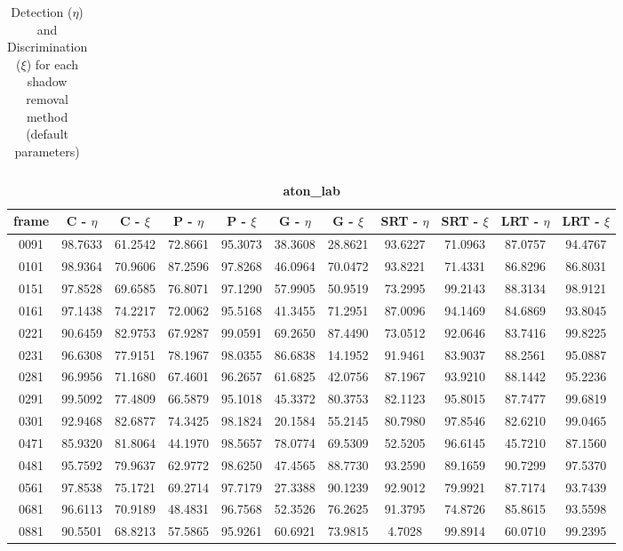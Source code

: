 \begin{appendices}
\begin{table}
\begin{tabular}{ |c|c|c|c|c|c|c|c|c|c|c| }
\hline
\end{tabular}
\caption*{Detection ($\eta$) and Discrimination ($\xi$) for each shadow removal method (default parameters)}
\end{table}

\begin{table}
\centering
\caption{\textbf{aton\_lab}}
\begin{tabular}{ |c|c|c|c|c|c|c|c|c|c|c| }
	\hline
\textbf{frame} &  \textbf{C - $\eta$} &  \textbf{C - $\xi$} &  \textbf{P - $\eta$} &  \textbf{P - $\xi$} &  \textbf{G - $\eta$} &  \textbf{G - $\xi$} &  \textbf{SRT - $\eta$} &  \textbf{SRT - $\xi$} &  \textbf{LRT - $\eta$} &  \textbf{LRT - $\xi$} \\
\hline
\hline
0091 &  98.7633 &  61.2542 &   72.8661 &  95.3073 &   38.3608 &  28.8621 &   93.6227 &  71.0963 &   87.0757 &  94.4767    \\
\hline
0101 &  98.9364 &  70.9606 &   87.2596 &  97.8268 &   46.0964 &  70.0472 &   93.8221 &  71.4331 &   86.8296 &  86.8031    \\
\hline
0151 &  97.8528 &  69.6585 &   76.8071 &  97.1290 &   57.9905 &  50.9519 &   73.2995 &  99.2143 &   88.3134 &  98.9121    \\
\hline
0161 &  97.1438 &  74.2217 &   72.0062 &  95.5168 &   41.3455 &  71.2951 &   87.0096 &  94.1469 &   84.6869 &  93.8045    \\
\hline
0221 &  90.6459 &  82.9753 &   67.9287 &  99.0591 &   69.2650 &  87.4490 &   73.0512 &  92.0646 &   83.7416 &  99.8225    \\
\hline
0231 &  96.6308 &  77.9151 &   78.1967 &  98.0355 &   86.6838 &  14.1952 &   91.9461 &  83.9037 &   88.2561 &  95.0887    \\
\hline
0281 &  96.9956 &  71.1680 &   67.4601 &  96.2657 &   61.6825 &  42.0756 &   87.1967 &  93.9210 &   88.1442 &  95.2236    \\
\hline
0291 &  99.5092 &  77.4809 &   66.5879 &  95.1018 &   45.3372 &  80.3753 &   82.1123 &  95.8015 &   87.7477 &  99.6819    \\
\hline
0301 &  92.9468 &  82.6877 &   74.3425 &  98.1824 &   20.1584 &  55.2145 &   80.7980 &  97.8546 &   82.6210 &  99.0465    \\
\hline
0471 &  85.9320 &  81.8064 &   44.1970 &  98.5657 &   78.0774 &  69.5309 &   52.5205 &  96.6145 &   45.7210 &  87.1560    \\
\hline
0481 &  95.7592 &  79.9637 &   62.9772 &  98.6250 &   47.4565 &  88.7730 &   93.2590 &  89.1659 &   90.7299 &  97.5370    \\
\hline
0561 &  97.8538 &  75.1721 &   69.2714 &  97.7179 &   27.3388 &  90.1239 &   92.9012 &  79.9921 &   87.7174 &  93.7439   \\
\hline
0681 &  96.6113 &  70.9189 &   48.4831 &  96.7568 &   52.3526 &  76.2625 &   91.3795 &  74.8726 &   85.8615 &  93.5598    \\
\hline
0881 &  90.5501 &  68.8213 &   57.5865 &  95.9261 &   60.6921 &  73.9815 &   4.7028 &  99.8914 &   60.0710 &  99.2395    \\


\end{tabular}
\end{table}
\end{appendices}
